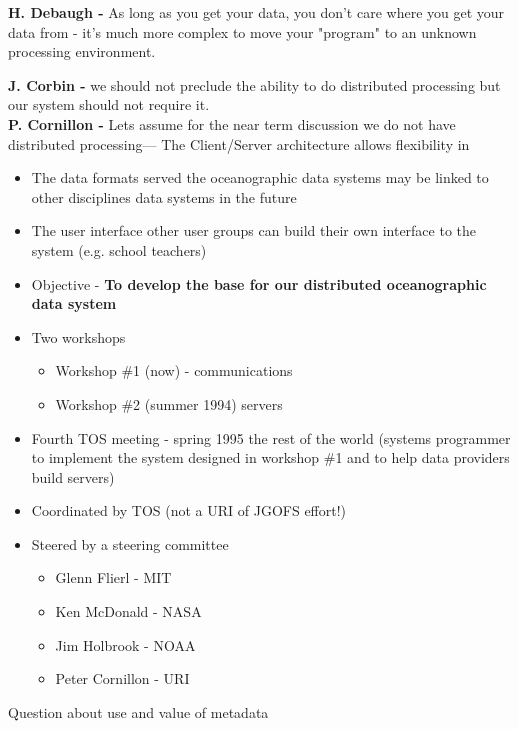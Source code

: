 \medskip
{\bf H. Debaugh -} As long as you get your data, you don't care where you get 
your data from - it's much more complex to move your "program" to an 
unknown processing environment.

\smallskip
{\bf J. Corbin -} we should not preclude the ability to do distributed
processing but our system should not require it.\\
{\bf P. Cornillon -} Lets assume for the near term discussion we do not have 
distributed processing---
\smallskip
The Client/Server architecture allows flexibility in
\begin{itemize}
	\item The data formats served the oceanographic data systems may be
linked to other disciplines data systems in the future 

	\item The user interface other user groups can build their own
interface to the system (e.g. school teachers) 
\end{itemize}

\begin{itemize}
	\item Objective - {\bf To develop the base for our distributed
oceanographic data system}
	\item Two workshops 
    	   \begin{itemize}
		\item Workshop \#1 (now) - communications
		\item Workshop \#2 (summer 1994) servers
    	   \end{itemize}
	\item Fourth TOS meeting - spring 1995 the rest of the world
	(systems programmer to implement the system designed in workshop 
	\#1 and to help data providers build servers)

	\item Coordinated by TOS (not a URI of JGOFS effort!)
	\item Steered by a steering committee
     	   \begin{itemize}
		\item Glenn Flierl - MIT
		\item Ken McDonald - NASA
		\item Jim Holbrook - NOAA
		\item Peter Cornillon - URI
     	   \end{itemize}
\end{itemize}

\medskip
\noindent Question about use and value of metadata\\

